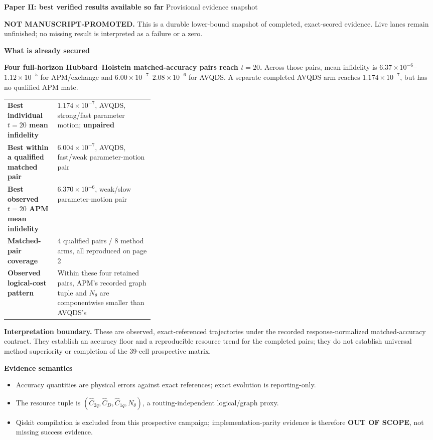 \documentclass[9pt,letterpaper,landscape]{article}
\newcommand{\statusbox}[2]{\colorbox{#1}{\parbox{0.965\linewidth}{\strut #2\strut}}}
\begin{document}
{\LARGE\bfseries\color{navy} Paper II: best verified results available so far}\hfill
{\large\color{gray}Provisional evidence snapshot}

\statusbox{amberpale}{\textcolor{amber}{\textbf{NOT MANUSCRIPT-PROMOTED.}} This is a durable lower-bound snapshot of completed, exact-scored evidence. Live lanes remain unfinished; no missing result is interpreted as a failure or a zero.}

\vspace{3pt}
\begin{minipage}[t]{0.48\linewidth}
{\large\bfseries\color{navy}What is already secured}

\statusbox{greenpale}{\textbf{Four full-horizon Hubbard--Holstein matched-accuracy pairs reach \(t=20\).} Across those pairs, mean infidelity is \(6.37\times10^{-6}\)--\(1.12\times10^{-5}\) for APM/exchange and \(6.00\times10^{-7}\)--\(2.08\times10^{-6}\) for AVQDS. A separate completed AVQDS arm reaches \(1.174\times10^{-7}\), but has no qualified APM mate.}

\begin{tabularx}{\linewidth}{@{}>{\bfseries}p{0.34\linewidth}Y@{}}
\toprule
Best individual \(t=20\) mean infidelity & \(1.174\times10^{-7}\), AVQDS, strong/fast parameter motion; \textbf{unpaired} \\
Best within a qualified matched pair & \(6.004\times10^{-7}\), AVQDS, fast/weak parameter-motion pair \\
Best observed \(t=20\) APM mean infidelity & \(6.370\times10^{-6}\), weak/slow parameter-motion pair \\
Matched-pair coverage & 4 qualified pairs / 8 method arms, all reproduced on page 2 \\
Observed logical-cost pattern & Within these four retained pairs, APM's recorded graph tuple and \(N_\theta\) are componentwise smaller than AVQDS's \\
\bottomrule
\end{tabularx}

\vspace{4pt}
{\bfseries Interpretation boundary.} These are observed, exact-referenced trajectories under the recorded response-normalized matched-accuracy contract. They establish an accuracy floor and a reproducible resource trend for the completed pairs; they do not establish universal method superiority or completion of the 39-cell prospective matrix.

\vspace{4pt}
{\large\bfseries\color{navy}Evidence semantics}
\begin{itemize}
  \item Accuracy quantities are physical errors against exact references; exact evolution is reporting-only.
  \item The resource tuple is \((\widehat C_{2q},\widehat C_D,\widehat C_{1q},N_\theta)\), a routing-independent logical/graph proxy.
  \item Qiskit compilation is excluded from this prospective campaign; implementation-parity evidence is therefore \textbf{OUT OF SCOPE}, not missing success evidence.
\end{itemize}
\end{minipage}\hfill
\end{document}

